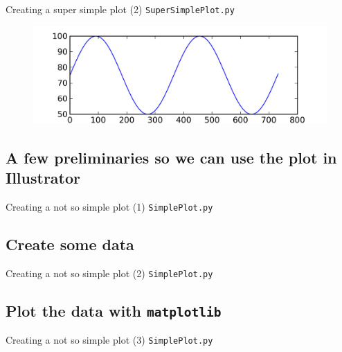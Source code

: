 \documentclass[t]{beamer}
\begin{document}
\begin{frame}{Creating a super simple plot (2)}
	\small{\texttt{SuperSimplePlot.py}}
	\vspace{-15pt}\begin{figure}[ht]
		\centering
		\includegraphics[width=4.5in]{figures/SuperSimplePlot.png}
	\end{figure}
\end{frame}


\subsection{A few preliminaries so we can use the plot in Illustrator}
\begin{frame}{Creating a not so simple plot (1)}
  \small{\texttt{SimplePlot.py}}
  \vspace{-15pt}\begin{figure}[ht]
  \centering
        \lstset{numbers=left}
        
   \end{figure}
\end{frame}

\subsection{Create some data}
\begin{frame}{Creating a not so simple plot (2)}
  \small{\texttt{SimplePlot.py}}
  \vspace{-15pt}\begin{figure}[ht]
  \centering
        \lstset{numbers=left}
        
   \end{figure}
\end{frame}

\subsection{Plot the data with \texttt{matplotlib}}
\begin{frame}{Creating a not so simple plot (3)}
  \small{\texttt{SimplePlot.py}}
  \vspace{-15pt}\begin{figure}[ht]
  \centering
        \lstset{numbers=left}
        
   \end{figure}
\end{frame}
\end{document}
